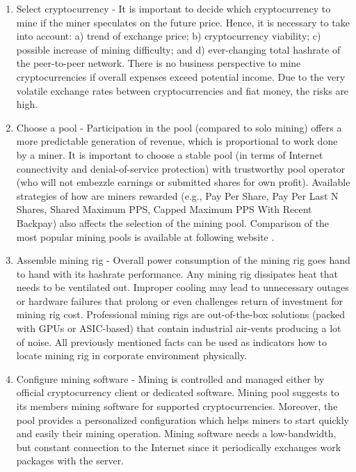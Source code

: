 \documentclass[preprint,12pt,3p]{elsarticle}
\begin{document}
\begin{enumerate}
    \item Select cryptocurrency - It is important to decide which cryptocurrency to mine if the miner speculates on the future price. Hence, it is necessary to take into account: a) trend of exchange price; b) cryptocurrency viability; c) possible increase of mining difficulty; and d) ever-changing total hashrate of the peer-to-peer network. There is no business perspective to mine cryptocurrencies if overall expenses exceed potential income. Due to the very volatile exchange rates between cryptocurrencies and fiat money, the risks are high.
    \item Choose a pool - Participation in the pool (compared to solo mining) offers a more predictable generation of revenue, which is proportional to work done by a miner. It is important to choose a stable pool (in terms of Internet connectivity and denial-of-service protection) with trustworthy pool operator (who will not embezzle earnings or submitted shares for own profit). Available strategies of how are miners rewarded (e.g., Pay Per Share, Pay Per Last N Shares, Shared Maximum PPS, Capped Maximum PPS With Recent Backpay) also affects the selection of the mining pool. Comparison of the most popular mining pools is available at following website \cite{COMPAREPOOL}.
    \item Assemble mining rig - Overall power consumption of the mining rig goes hand to hand with its hashrate performance. Any mining rig dissipates heat that needs to be ventilated out. Improper cooling may lead to unnecessary outages or hardware failures that prolong or even challenges return of investment for mining rig cost. Professional mining rigs are out-of-the-box solutions (packed with GPUs or ASIC-based) that contain industrial air-vents producing a lot of noise. All previously mentioned facts can be used as indicators how to locate mining rig in corporate environment physically. 
    \item Configure mining software - Mining is controlled and managed either by official cryptocurrency client or dedicated software. Mining pool suggests to its members mining software for supported cryptocurrencies. Moreover, the pool provides a personalized configuration which helps miners to start quickly and easily their mining operation. Mining software needs a low-bandwidth, but constant connection to the Internet since it periodically exchanges work packages with the server. 
\end{enumerate}
\end{document}
